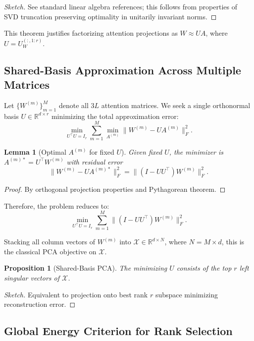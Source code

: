 \documentclass[11pt]{article}
\newtheorem{lemma}[theorem]{Lemma}
\newtheorem{proposition}[theorem]{Proposition}
\theoremstyle{definition}
\begin{document}
\begin{proof}[Sketch]
See standard linear algebra references; this follows from properties of SVD truncation preserving optimality in unitarily invariant norms.
\end{proof}

This theorem justifies factorizing attention projections as \(W \approx U A\), where \(U = U_W^{(:,1:r)}\).

\subsection{Shared-Basis Approximation Across Multiple Matrices}

Let \(\{W^{(m)}\}_{m=1}^M\) denote all \(3L\) attention matrices. We seek a single orthonormal basis \(U \in \mathbb{R}^{d \times r}\) minimizing the total approximation error:
\[
\min_{U^\top U = I_r} \sum_{m=1}^M \min_{A^{(m)}} \|W^{(m)} - U A^{(m)}\|_F^2.
\]

\begin{lemma}[Optimal \(A^{(m)}\) for fixed \(U\)]
Given fixed \(U\), the minimizer is \(A^{(m)*} = U^\top W^{(m)}\) with residual error
\[
\| W^{(m)} - U A^{(m)*} \|_F^2 = \| (I - U U^\top) W^{(m)} \|_F^2.
\]
\end{lemma}

\begin{proof}
By orthogonal projection properties and Pythagorean theorem.
\end{proof}

Therefore, the problem reduces to:
\[
\min_{U^\top U = I_r} \sum_{m=1}^M \| (I - U U^\top) W^{(m)} \|_F^2.
\]

Stacking all column vectors of \(W^{(m)}\) into \(\mathcal{X} \in \mathbb{R}^{d \times N}\), where \(N = M \times d\),
this is the classical PCA objective on \(\mathcal{X}\).

\begin{proposition}[Shared-Basis PCA]
The minimizing \(U\) consists of the top \(r\) left singular vectors of \(\mathcal{X}\).
\end{proposition}

\begin{proof}[Sketch]
Equivalent to projection onto best rank \(r\) subspace minimizing reconstruction error.
\end{proof}

\subsection{Global Energy Criterion for Rank Selection}
\end{document}
